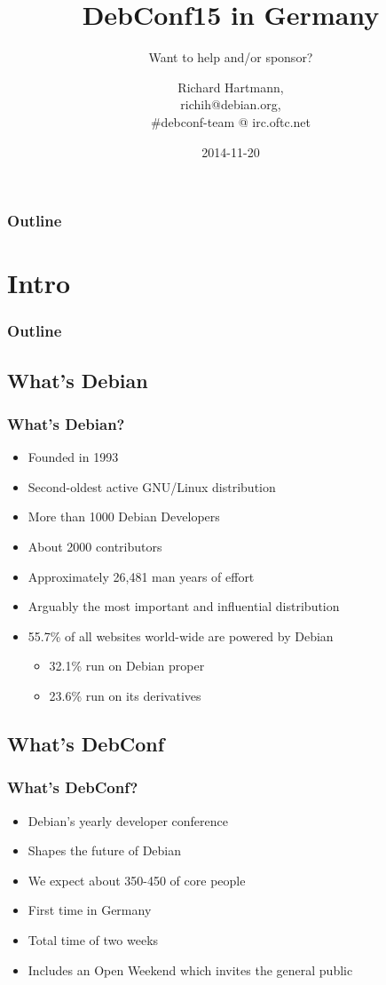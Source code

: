 \documentclass[t]{beamer}
\title{DebConf15 in Germany}
\subtitle{Want to help and/or sponsor?}
\author{Richard Hartmann,\\
	richih@debian.org,\\
	\#debconf-team @ irc.oftc.net
}
\date{2014-11-20}
\begin{document}
\setcounter{tocdepth}{1}

\begin{frame}
	\titlepage
\end{frame}

\begin{frame}
	\frametitle{Outline}
	\tableofcontents
\end{frame}

\section{Intro}

\begin{frame}
	\frametitle{Outline}
	\tableofcontents[currentsection]
\end{frame}

\subsection{What's Debian}

\begin{frame}
	\frametitle{What's Debian?}
	\vfill
	\begin{itemize}
		\item Founded in 1993
		\item Second-oldest active GNU/Linux distribution
		\item More than 1000 Debian Developers
		\item About 2000 contributors
		\item Approximately 26,481 man years of effort
		\item Arguably the most important and influential distribution
		\item 55.7\% of all websites world-wide are powered by Debian
		\begin{itemize}
		\item 32.1\% run on Debian proper
		\item 23.6\% run on its derivatives
		\end{itemize}
	\end{itemize}
	\vfill
\end{frame}

\subsection{What's DebConf}

\begin{frame}
	\frametitle{What's DebConf?}
	\vfill
	\begin{itemize}
		\item Debian's yearly developer conference
		\item Shapes the future of Debian
		\item We expect about 350-450 of core people
		\item First time in Germany
		\item Total time of two weeks
			\item Includes an Open Weekend which invites the general public
	\end{itemize}
	\vfill
\end{frame}
\end{document}
